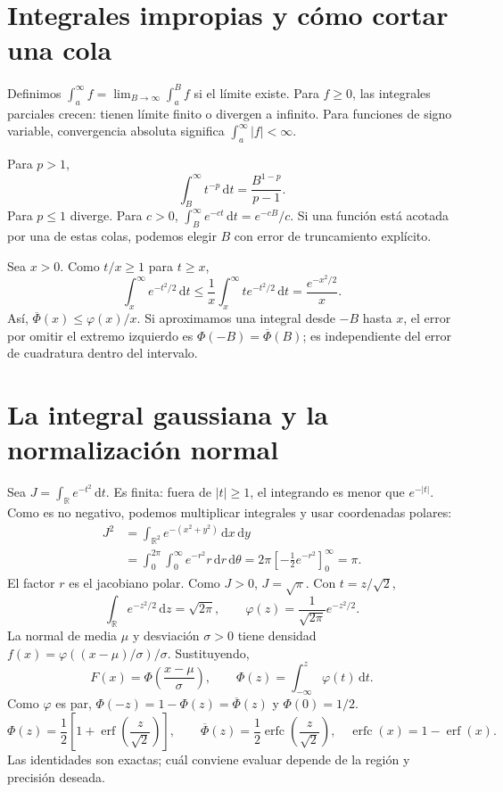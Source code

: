 \documentclass[11pt,a4paper]{article}
\newcommand{\R}{\mathbb R}
\newcommand{\dd}{\,\mathrm d}
\theoremstyle{definition}
\DeclareMathOperator{\erf}{erf}
\DeclareMathOperator{\erfc}{erfc}
\newcommand{\ph}{\varphi}
\newcommand{\Q}{\overline\Phi}
\begin{document}
\section{Integrales impropias y cómo cortar una cola}
Definimos $\int_a^\infty f=\lim_{B\to\infty}\int_a^B f$ si el límite existe. Para $f\ge0$, las integrales parciales crecen: tienen límite finito o divergen a infinito. Para funciones de signo variable, convergencia absoluta significa $\int_a^\infty|f|<\infty$.

Para $p>1$,
\[
\int_B^\infty t^{-p}\dd t=\frac{B^{1-p}}{p-1}.
\]
Para $p\le1$ diverge. Para $c>0$, $\int_B^\infty e^{-ct}\dd t=e^{-cB}/c$. Si una función está acotada por una de estas colas, podemos elegir $B$ con error de truncamiento explícito.

Sea $x>0$. Como $t/x\ge1$ para $t\ge x$,
\[
\int_x^\infty e^{-t^2/2}\dd t
\le\frac1x\int_x^\infty t e^{-t^2/2}\dd t
=\frac{e^{-x^2/2}}x.
\]
Así, $\Q(x)\le\ph(x)/x$. Si aproximamos una integral desde $-B$ hasta $x$, el error por omitir el extremo izquierdo es $\Phi(-B)=\Q(B)$; es independiente del error de cuadratura dentro del intervalo.

\section{La integral gaussiana y la normalización normal}
Sea $J=\int_\R e^{-t^2}\dd t$. Es finita: fuera de $|t|\ge1$, el integrando es menor que $e^{-|t|}$. Como es no negativo, podemos multiplicar integrales y usar coordenadas polares:
\begin{align*}
J^2&=\int_{\R^2}e^{-(x^2+y^2)}\dd x\dd y\\
&=\int_0^{2\pi}\int_0^\infty e^{-r^2}r\dd r\dd\theta
=2\pi\left[-\frac12e^{-r^2}\right]_0^\infty=\pi.
\end{align*}
El factor $r$ es el jacobiano polar. Como $J>0$, $J=\sqrt\pi$. Con $t=z/\sqrt2$,
\[
\int_\R e^{-z^2/2}\dd z=\sqrt{2\pi},\qquad
\ph(z)=\frac1{\sqrt{2\pi}}e^{-z^2/2}.
\]
La normal de media $\mu$ y desviación $\sigma>0$ tiene densidad
$f(x)=\ph((x-\mu)/\sigma)/\sigma$. Sustituyendo,
\[
F(x)=\Phi\left(\frac{x-\mu}{\sigma}\right),\qquad
\Phi(z)=\int_{-\infty}^z\ph(t)\dd t.
\]
Como $\ph$ es par, $\Phi(-z)=1-\Phi(z)=\Q(z)$ y $\Phi(0)=1/2$.
\[
\Phi(z)=\frac12\left[1+\erf\left(\frac z{\sqrt2}\right)\right],
\qquad \Q(z)=\frac12\erfc\left(\frac z{\sqrt2}\right),\quad
\erfc(x)=1-\erf(x).
\]
Las identidades son exactas; cuál conviene evaluar depende de la región y precisión deseada.
\end{document}

